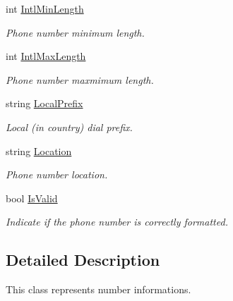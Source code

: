 \begin{DoxyCompactItemize}
int \hyperlink{class_thecallr_api_1_1_objects_1_1_misc_1_1_number_infos_a6b96053704b6026f7886d019f303dbe5}{Intl\+Min\+Length}
\begin{DoxyCompactList}\small\item\em Phone number minimum length. \end{DoxyCompactList}\item 
int \hyperlink{class_thecallr_api_1_1_objects_1_1_misc_1_1_number_infos_ad0a130d272762b15ea69711268dc2627}{Intl\+Max\+Length}
\begin{DoxyCompactList}\small\item\em Phone number maxmimum length. \end{DoxyCompactList}\item 
string \hyperlink{class_thecallr_api_1_1_objects_1_1_misc_1_1_number_infos_a48934ffd8f152c14a58c123ce24d8a16}{Local\+Prefix}
\begin{DoxyCompactList}\small\item\em Local (in country) dial prefix. \end{DoxyCompactList}\item 
string \hyperlink{class_thecallr_api_1_1_objects_1_1_misc_1_1_number_infos_a70092e14f6adb050009573a4174f8fb2}{Location}
\begin{DoxyCompactList}\small\item\em Phone number location. \end{DoxyCompactList}\item 
bool \hyperlink{class_thecallr_api_1_1_objects_1_1_misc_1_1_number_infos_ab7c2f3ff6512ea08bc2a2c23278fe960}{Is\+Valid}
\begin{DoxyCompactList}\small\item\em Indicate if the phone number is correctly formatted. \end{DoxyCompactList}\end{DoxyCompactItemize}


\subsection{Detailed Description}
This class represents number informations. 



